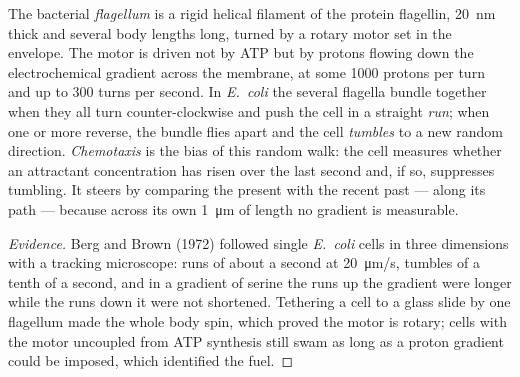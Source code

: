 \begin{proposition}\label{prop:b2:unicellular-diversity:flagellum}
The bacterial \emph{flagellum} is a rigid helical filament of the
protein flagellin, \qty{20}{nm} thick and several body lengths long,
turned by a rotary motor set in the envelope. The motor is driven not
by ATP but by protons flowing down the electrochemical gradient
across the membrane, at some \num{1000} protons per turn and up to
\num{300} turns per second. In \emph{E.~coli} the several flagella
bundle together when they all turn counter-clockwise and push the
cell in a straight \emph{run}; when one or more reverse, the bundle
flies apart and the cell \emph{tumbles} to a new random direction.
\emph{Chemotaxis} is the bias of this random walk: the cell measures
whether an attractant concentration has risen over the last second
and, if so, suppresses tumbling. It steers by comparing the present
with the recent past --- along its path --- because across its own
\qty{1}{\micro m} of length no gradient is measurable.
\end{proposition}
\begin{proof}[Evidence]
Berg and Brown (1972) followed single \emph{E.~coli} cells in three
dimensions with a tracking microscope: runs of about a second at
\qty{20}{\micro m/s}, tumbles of a tenth of a second, and in a
gradient of serine the runs up the gradient were longer while the
runs down it were not shortened. Tethering a cell to a glass slide by
one flagellum made the whole body spin, which proved the motor is
rotary; cells with the motor uncoupled from ATP synthesis still swam
as long as a proton gradient could be imposed, which identified the
fuel.
\end{proof}

